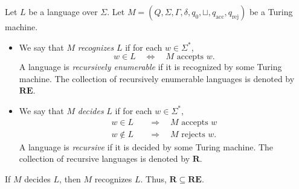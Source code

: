 \begin{definition}
  Let $L$ be a language over $\Sigma$.
  Let $M = (Q, \Sigma, \Gamma, \delta, q_0, \sqcup, q_\text{acc},
  q_\text{rej})$ be a Turing machine.
  \begin{itemize}
    \item We say that $M$ \emph{recognizes} $L$ if for each $w \in \Sigma^*$,
    \begin{equation*}
      w \in L
      \quad \Leftrightarrow \quad
      \text{$M$ accepts $w$}.
    \end{equation*}
    A language is \emph{recursively enumerable} if it is recognized by some
    Turing machine.
    The collection of recursively enumerable languages is denoted by
    $\mathbf{RE}$.
    \item We say that $M$ \emph{decides} $L$ if for each $w \in \Sigma^*$,
    \begin{align*}
      w \in L
      \quad &\Rightarrow \quad
      \text{$M$ accepts $w$} \\
      w \notin L
      \quad &\Rightarrow \quad
      \text{$M$ rejects $w$}.
    \end{align*}
    A language is \emph{recursive} if it is decided by some Turing machine.
    The collection of recursive languages is denoted by $\mathbf{R}$.
  \end{itemize}
\end{definition}
\begin{remark}
  If $M$ decides $L$, then $M$ recognizes $L$.
  Thus, $\mathbf{R} \subseteq \mathbf{RE}$.
\end{remark}

